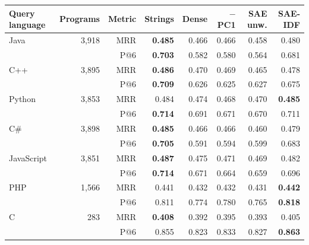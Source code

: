 \begin{tabular}{@{}lrrrrrrr@{}}
\toprule
Query language & Programs & Metric & Strings & Dense & $-$PC1 & SAE unw. & \textbf{SAE-IDF} \\
\midrule
Java & 3,918 & MRR & \textbf{0.485} & 0.466 & 0.466 & 0.458 & 0.480 \\
 &  & P@6 & \textbf{0.703} & 0.582 & 0.580 & 0.564 & 0.681 \\
C++ & 3,895 & MRR & \textbf{0.486} & 0.470 & 0.469 & 0.465 & 0.478 \\
 &  & P@6 & \textbf{0.709} & 0.626 & 0.625 & 0.627 & 0.675 \\
Python & 3,853 & MRR & 0.484 & 0.474 & 0.468 & 0.470 & \textbf{0.485} \\
 &  & P@6 & \textbf{0.714} & 0.691 & 0.671 & 0.670 & 0.711 \\
C\# & 3,898 & MRR & \textbf{0.485} & 0.466 & 0.466 & 0.460 & 0.479 \\
 &  & P@6 & \textbf{0.705} & 0.591 & 0.594 & 0.599 & 0.683 \\
JavaScript & 3,851 & MRR & \textbf{0.487} & 0.475 & 0.471 & 0.469 & 0.482 \\
 &  & P@6 & \textbf{0.714} & 0.671 & 0.664 & 0.659 & 0.696 \\
PHP & 1,566 & MRR & 0.441 & 0.432 & 0.432 & 0.431 & \textbf{0.442} \\
 &  & P@6 & 0.811 & 0.774 & 0.780 & 0.765 & \textbf{0.818} \\
C & 283 & MRR & \textbf{0.408} & 0.392 & 0.395 & 0.393 & 0.405 \\
 &  & P@6 & 0.855 & 0.823 & 0.833 & 0.827 & \textbf{0.863} \\
\bottomrule
\end{tabular}
